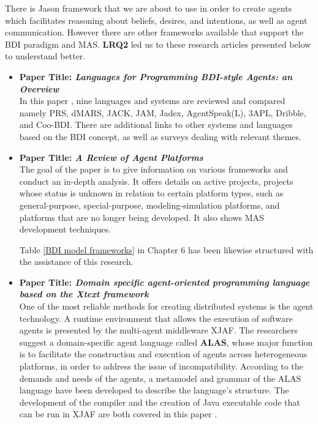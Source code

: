 \vspace{.5cm}

There is Jason framework that we are about to use in order to create agents which facilitates reasoning about beliefs, desires, and intentions, as well as agent communication. However there are other frameworks available that support the \ac{BDI} paradigm and \ac{MAS}. \textbf{LRQ2} led us to these research articles presented below to understand better.

\newpage

\begin{itemize}[label={}]

\item \textbf{Paper Title: \textit{Languages for Programming \ac{BDI}-style Agents: an Overview}}\\

In this paper \cite{9lang}, nine languages and systems are reviewed and compared namely PRS, dMARS, JACK, JAM, Jadex, AgentSpeak(L), 3APL, Dribble, and Coo-\ac{BDI}. There are additional links to other systems and languages based on the \ac{BDI} concept, as well as surveys dealing with relevant themes.

\vspace{.5cm}

\item \textbf{Paper Title: \textit{A Review of Agent Platforms}}\\

The goal of the paper \cite{review} is to give information on various frameworks and conduct an in-depth analysis. It offers details on active projects, projects whose status is unknown in relation to certain platform types, such as general-purpose, special-purpose, modeling-simulation platforms, and platforms that are no longer being developed. It also shows \ac{MAS} development techniques.

\vspace{.5cm}

Table \ref{BDI model frameworks} in Chapter 6 has been likewise structured with the assistance of this research.

\vspace{.5cm}

\item \textbf{Paper Title: \textit{Domain specific agent-oriented programming language based on the Xtext framework}} \\

One of the most reliable methods for creating distributed systems is the agent technology. A runtime environment that allows the execution of software agents is presented by the multi-agent middleware XJAF. The researchers suggest a domain-specific agent language called \textbf{ALAS}, whose major function is to facilitate the construction and execution of agents across heterogeneous platforms, in order to address the issue of incompatibility. According to the demands and needs of the agents, a metamodel and grammar of the ALAS language have been developed to describe the language's structure. The development of the compiler and the creation of Java executable code that can be run in XJAF are both covered in this paper \cite{xtext}.


\end{itemize}
